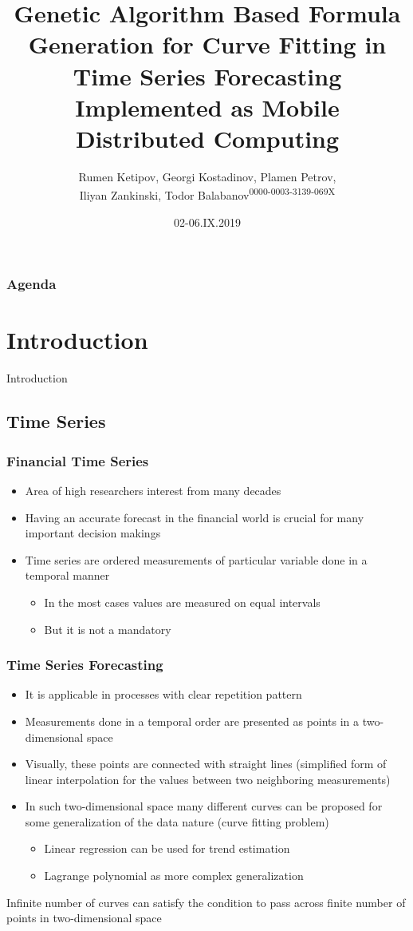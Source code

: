 \documentclass{beamer}
\title[High Performance Conference, September 02-06, 2019, Borovets, Bulgaria]{
	Genetic Algorithm Based Formula Generation for Curve Fitting in Time Series Forecasting Implemented as Mobile Distributed Computing
}
\author{Rumen Ketipov, Georgi Kostadinov, Plamen Petrov,\\ Iliyan Zankinski, Todor Balabanov\textsuperscript{0000-0003-3139-069X}}
\date{02-06.IX.2019}
\institute[IICT-BAS, HPC'19] {
	Institute of Information and Communication Technologies \\ 
	Bulgarian Academy of Sciences \\
	\medskip
	\textit{todorb@iinf.bas.bg}
}
\begin{document}
\begin{frame}
\titlepage
\end{frame}

\begin{frame}
\frametitle{Agenda}
\tableofcontents
\end{frame}

\section{Introduction}

\begin{frame}
\center \huge{Introduction}
\end{frame}

\subsection{Time Series}

\begin{frame}
\frametitle{Financial Time Series}
\begin{itemize}
	\item Area of high researchers interest from many decades
	\item Having an accurate forecast in the financial world is crucial for many important decision makings
	\item Time series are ordered measurements of particular variable done in a temporal manner
	\begin{itemize}
		\item In the most cases values are measured on equal intervals
		\item But it is not a mandatory 
	\end{itemize}
\end{itemize}
\end{frame}

\begin{frame}
\frametitle{Time Series Forecasting}
\begin{itemize}
	\item It is applicable in processes with clear repetition pattern
	\item Measurements done in a temporal order are presented as points in a two-dimensional space
	\item Visually, these points are connected with straight lines (simplified form of linear interpolation for the values between two neighboring measurements)
	\item In such two-dimensional space many different curves can be proposed for some generalization of the data nature (curve fitting problem)
	\begin{itemize}
		\item Linear regression can be used for trend estimation
		\item Lagrange polynomial as more complex generalization
	\end{itemize}
\end{itemize}
{\color{red} Infinite number of curves can satisfy the condition to pass across finite number of points in two-dimensional space}
\end{frame}
\end{document}
